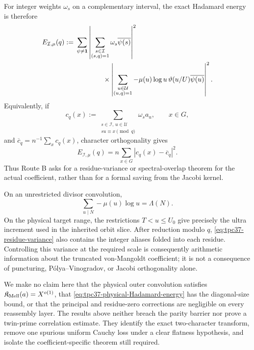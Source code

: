 For integer weights \(\omega_s\) on a complementary interval, the exact
Hadamard energy is therefore
\begin{align}
 E_{\mathcal I,\mu}(q)
 :={}&\sum_{\psi\ne\mathbf1}
 \left|
  \sum_{\substack{s\in\mathcal I\\(s,q)=1}}
  \omega_s\overline{\psi(s)}
 \right|^2
 \notag\\
 &\hspace{4em}\times
 \left|
  \sum_{\substack{u\in\mathcal U\\(u,q)=1}}
  -\mu(u)\log u\,\vartheta(u/U)
  \overline{\psi(u)}
 \right|^2.
 \label{eq:tpc37-physical-Hadamard-energy}
\end{align}
Equivalently, if
\begin{equation}
 c_q(x):=
 \sum_{\substack{s\in\mathcal I,\,u\in\mathcal U\\
 su\equiv x\!\!\pmod q}}
 \omega_s a_u,
 \qquad x\in G,
 \label{eq:tpc37-residue-convolution}
\end{equation}
and \(\overline c_q=n^{-1}\sum_xc_q(x)\), character orthogonality gives
\begin{equation}
 \boxed{
 E_{\mathcal I,\mu}(q)
 =n\sum_{x\in G}|c_q(x)-\overline c_q|^2.}
 \label{eq:tpc37-residue-variance}
\end{equation}
Thus Route B asks for a residue-variance or spectral-overlap theorem for
the actual coefficient, rather than for a formal saving from the Jacobi
kernel.

On an unrestricted divisor convolution,
\begin{equation}
 \sum_{u\mid N}-\mu(u)\log u=\Lambda(N).
 \label{eq:tpc37-Mobius-von-Mangoldt}
\end{equation}
On the physical target range, the restrictions
\(T<u\le U_0\) give precisely the ultra increment used in the inherited
orbit slice.  After reduction modulo \(q\),
\eqref{eq:tpc37-residue-variance} also contains the integer aliases
folded into each residue.  Controlling this variance at the required
scale is consequently arithmetic information about the truncated
von-Mangoldt coefficient; it is not a consequence of puncturing,
P\'olya--Vinogradov, or Jacobi orthogonality alone.

We make no claim here that the physical outer convolution satisfies
\(\mathfrak K_{\rm Mell}(a)=X^{o(1)}\), that
\eqref{eq:tpc37-physical-Hadamard-energy} has the diagonal-size bound, or
that the principal and residue-zero corrections are negligible on every
reassembly layer.  The results above neither breach the parity barrier
nor prove a twin-prime correlation estimate.  They identify the exact
two-character transform, remove one spurious uniform Cauchy loss under a
clear flatness hypothesis, and isolate the coefficient-specific theorem
still required.
